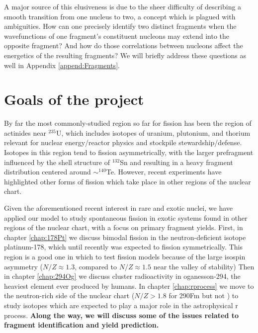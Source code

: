 A major source of this elusiveness is due to the sheer difficulty of describing a smooth transition from one nucleus to two, a concept which is plagued with ambiguities. How can one precisely identify two distinct fragments when the wavefunctions of one fragment’s constituent nucleons may extend into the opposite fragment? And how do those correlations between nucleons affect the energetics of the resulting fragments? We will briefly address these questions as well in Appendix \ref{append:Fragments}.


\section{Goals of the project}
By far the most commonly-studied region so far for fission has been the region of actinides near $^{235}$U, which includes isotopes of uranium, plutonium, and thorium relevant for nuclear energy/reactor physics and stockpile stewardship/defense. Isotopes in this region tend to fission asymmetrically, with the larger prefragment influenced by the shell structure of $^{132}$Sn and resulting in a heavy fragment distribution centered around $\sim^{140}$Te. However, recent experiments have highlighted other forms of fission which take place in other regions of the nuclear chart.

Given the aforementioned recent interest in rare and exotic nuclei, we have applied our model to study spontaneous fission in exotic systems found in other regions of the nuclear chart, with a focus on primary fragment yields. First, in chapter \ref{chap:178Pt} we discuss bimodal fission in the neutron-deficient isotope platinum-178, which until recently was expected to fission symmetrically. This region is a good one in which to test fission models because of the large isospin asymmetry ($N/Z\approx1.3$, compared to $N/Z\approx1.5$ near the valley of stability) Then in chapter \ref{chap:294Og} we discuss cluster radioactivity in oganesson-294, the heaviest element ever produced by humans. In chapter \ref{chap:rprocess} we move to the neutron-rich side of the nuclear chart ($N/Z>1.8$ for 290Fm but not {\Cf}) to study isotopes which are expected to play a major role in the astrophysical r process. \textbf{Along the way, we will discuss some of the issues related to fragment identification and yield prediction.}


